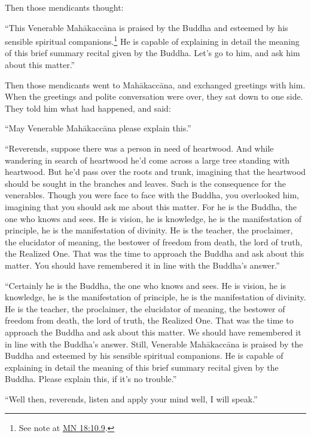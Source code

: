 \documentclass[12pt,openany]{book}%
\begin{document}
Then those mendicants thought: 

“This Venerable \textsanskrit{Mahākaccāna} is praised by the Buddha and esteemed by his sensible spiritual companions.\footnote{See note at \href{https://suttacentral.net/mn18/en/sujato\#10.9}{MN 18:10.9}. } He is capable of explaining in detail the meaning of this brief summary recital given by the Buddha. Let’s go to him, and ask him about this matter.” 

Then those mendicants went to \textsanskrit{Mahākaccāna}, and exchanged greetings with him. When the greetings and polite conversation were over, they sat down to one side. They told him what had happened, and said: 

“May Venerable \textsanskrit{Mahākaccāna} please explain this.” 

“Reverends, suppose there was a person in need of heartwood. And while wandering in search of heartwood he’d come across a large tree standing with heartwood. But he’d pass over the roots and trunk, imagining that the heartwood should be sought in the branches and leaves. Such is the consequence for the venerables. Though you were face to face with the Buddha, you overlooked him, imagining that you should ask me about this matter. For he is the Buddha, the one who knows and sees. He is vision, he is knowledge, he is the manifestation of principle, he is the manifestation of divinity. He is the teacher, the proclaimer, the elucidator of meaning, the bestower of freedom from death, the lord of truth, the Realized One. That was the time to approach the Buddha and ask about this matter. You should have remembered it in line with the Buddha’s answer.” 

“Certainly he is the Buddha, the one who knows and sees. He is vision, he is knowledge, he is the manifestation of principle, he is the manifestation of divinity. He is the teacher, the proclaimer, the elucidator of meaning, the bestower of freedom from death, the lord of truth, the Realized One. That was the time to approach the Buddha and ask about this matter. We should have remembered it in line with the Buddha’s answer. Still, Venerable \textsanskrit{Mahākaccāna} is praised by the Buddha and esteemed by his sensible spiritual companions. He is capable of explaining in detail the meaning of this brief summary recital given by the Buddha. Please explain this, if it’s no trouble.” 

“Well then, reverends, listen and apply your mind well, I will speak.” 
\end{document}
